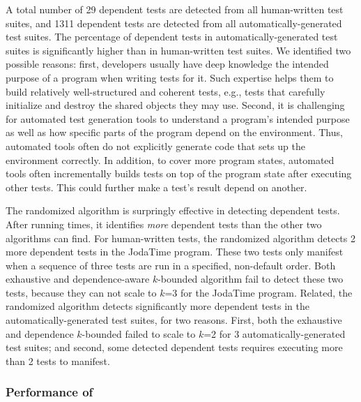 A total number of 29 dependent tests are detected
from all human-written test suites, and 1311
dependent tests are detected from all automatically-generated
test suites. The percentage of dependent tests
in automatically-generated test suites is significantly
higher than in human-written test suites. We identified
two possible reasons: first, developers usually have deep
knowledge the intended purpose of a program when writing tests
for it. Such expertise helps them to build relatively well-structured and coherent
tests, e.g., tests that carefully initialize and destroy the
shared objects they may use. Second, 
 it is challenging for automated test generation tools to understand
 a program's intended purpose as well as how
specific parts of the program depend on the environment.
Thus, automated tools often do not explicitly generate code that sets up the
environment correctly.  In addition, to cover more
program states, automated tools often incrementally
builds tests on top of the program state after executing
other tests. This could further make a test's result depend on another.





The randomized algorithm is surpringly effective in
detecting dependent tests. After running \trialnum times,
it identifies \textit{more} dependent tests than the other
two algorithms can find. For human-written
tests, the randomized algorithm detects 2 more dependent
tests in the JodaTime program. These two tests only
manifest when a sequence of three tests are run in a specified,
non-default order. Both exhaustive and dependence-aware $k$-bounded
algorithm fail to detect these two tests, because
they can not scale to $k$=3 for the
JodaTime program. Related, the randomized algorithm
detects significantly more dependent
tests in the automatically-generated test suites, for
two reasons. First,
both the exhaustive and dependence $k$-bounded
failed to scale to $k$=2 for 3 automatically-generated test suites;
and second, some detected dependent tests requires executing more than 2 tests
to manifest.


\subsubsection{Performance of \ourtool}
\label{sec:performance}

